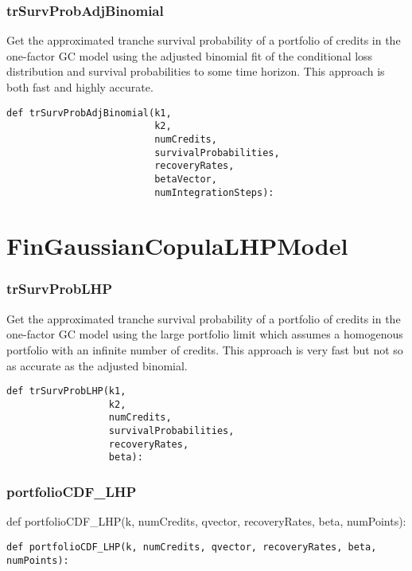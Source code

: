 \documentclass[twoside,11pt]{book}
\begin{document}
\subsubsection*{{\bf trSurvProbAdjBinomial}}
Get the approximated tranche survival probability of a portfolio of credits in the one-factor GC model using the adjusted binomial fit of the conditional loss distribution and survival probabilities to some time horizon. This approach is both fast and highly accurate.  

\begin{lstlisting}
def trSurvProbAdjBinomial(k1,
                          k2,
                          numCredits,
                          survivalProbabilities,
                          recoveryRates,
                          betaVector,
                          numIntegrationSteps):
\end{lstlisting}

\newpage
\section{FinGaussianCopulaLHPModel}

\subsubsection*{{\bf trSurvProbLHP}}
Get the approximated tranche survival probability of a portfolio of credits in the one-factor GC model using the large portfolio limit which assumes a homogenous portfolio with an infinite number of credits. This approach is very fast but not so as accurate as the adjusted binomial.  

\begin{lstlisting}
def trSurvProbLHP(k1,
                  k2,
                  numCredits,
                  survivalProbabilities,
                  recoveryRates,
                  beta):
\end{lstlisting}

\subsubsection*{{\bf portfolioCDF\_LHP}}
def portfolioCDF\_LHP(k, numCredits, qvector, recoveryRates, beta, numPoints): 

\begin{lstlisting}
def portfolioCDF_LHP(k, numCredits, qvector, recoveryRates, beta, numPoints):
\end{lstlisting}
\end{document}
